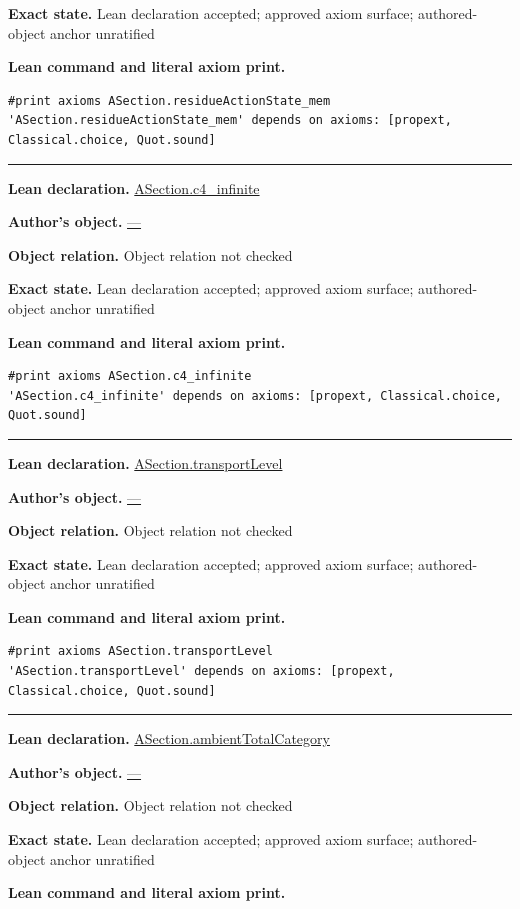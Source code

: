 \documentclass[11pt]{article}
\theoremstyle{plain}
\theoremstyle{definition}
\theoremstyle{remark}
\begin{document}
\begin{tcolorbox}
\par\textbf{Exact state.} Lean declaration accepted; approved axiom surface; authored-object anchor unratified
\par\smallskip\textbf{Lean command and literal axiom print.}
\begin{Verbatim}[breaklines=true,breakanywhere=true,fontsize=\small]
#print axioms ASection.residueActionState_mem
'ASection.residueActionState_mem' depends on axioms: [propext, Classical.choice, Quot.sound]
\end{Verbatim}
\medskip\hrule\medskip
\textbf{Lean declaration.} \url{ASection.c4_infinite}
\par\textbf{Author's object.} \url{—}
\par\textbf{Object relation.} Object relation not checked
\par\textbf{Exact state.} Lean declaration accepted; approved axiom surface; authored-object anchor unratified
\par\smallskip\textbf{Lean command and literal axiom print.}
\begin{Verbatim}[breaklines=true,breakanywhere=true,fontsize=\small]
#print axioms ASection.c4_infinite
'ASection.c4_infinite' depends on axioms: [propext, Classical.choice, Quot.sound]
\end{Verbatim}
\medskip\hrule\medskip
\textbf{Lean declaration.} \url{ASection.transportLevel}
\par\textbf{Author's object.} \url{—}
\par\textbf{Object relation.} Object relation not checked
\par\textbf{Exact state.} Lean declaration accepted; approved axiom surface; authored-object anchor unratified
\par\smallskip\textbf{Lean command and literal axiom print.}
\begin{Verbatim}[breaklines=true,breakanywhere=true,fontsize=\small]
#print axioms ASection.transportLevel
'ASection.transportLevel' depends on axioms: [propext, Classical.choice, Quot.sound]
\end{Verbatim}
\medskip\hrule\medskip
\textbf{Lean declaration.} \url{ASection.ambientTotalCategory}
\par\textbf{Author's object.} \url{—}
\par\textbf{Object relation.} Object relation not checked
\par\textbf{Exact state.} Lean declaration accepted; approved axiom surface; authored-object anchor unratified
\par\smallskip\textbf{Lean command and literal axiom print.}

\end{tcolorbox}
\end{document}

